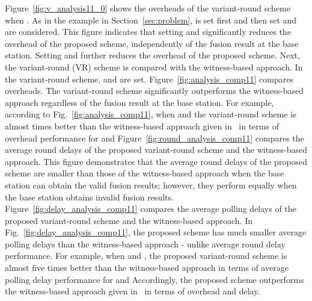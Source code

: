 \documentclass[12pt, onecolumn, draftcls]{IEEEtran}
\begin{document}
Figure~\ref{fig:v_analysis11_0} shows the overheads of the
variant-round scheme  when . As in the example in
Section~\ref{sec:problem},  is set first and then
set  and  are considered. This
figure indicates that setting  and  significantly
reduces the overhead of the proposed scheme, independently of the
fusion result at the base station. Setting  and 
further reduces the overhead of the proposed scheme. Next, the
variant-round (VR) scheme is compared with the witness-based
approach. In the variant-round scheme,  and  are
set. Figure~\ref{fig:analysis_comp11} compares overheads. The
variant-round scheme significantly outperforms the witness-based
approach regardless of the fusion result at the base station. For
example, according to Fig.~\ref{fig:analysis_comp11}, when  and
 the variant-round scheme is almost  times better than the
witness-based approach given in~\cite{du:assurance} in terms of
overhead performance for  and 
Figure~\ref{fig:round_analysis_comp11} compares the average round
delays of the proposed variant-round scheme and the witness-based
approach. This figure demonstrates that the average round delays of
the proposed scheme are smaller than those of the witness-based
approach when the base station can obtain the valid fusion results;
however, they perform equally when the base station obtains invalid
fusion results. Figure~\ref{fig:delay_analysis_comp11} compares the
average polling delays of the proposed variant-round scheme and the
witness-based approach. In Fig.~\ref{fig:delay_analysis_comp11}, the
proposed scheme has much smaller average polling delays than the
witness-based approach - unlike average round delay performance. For
example, when  and , the proposed variant-round scheme
is almost five times better than the witness-based approach in terms
of average polling delay performance for  and  Accordingly,
the proposed scheme outperforms the witness-based approach given
in~\cite{du:assurance} in terms of overhead and delay.
\end{document}
